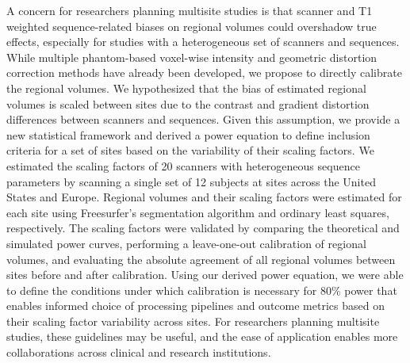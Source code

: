 
A concern for researchers planning multisite studies is that scanner and T1 weighted sequence-related biases on regional volumes could overshadow true effects, especially for studies with a heterogeneous set of scanners and sequences. While multiple phantom-based voxel-wise intensity and geometric distortion correction methods have already been developed, we propose to directly calibrate the regional volumes. We hypothesized that the bias of estimated regional volumes is scaled between sites due to the contrast and gradient distortion differences between scanners and sequences. Given this assumption, we provide a new statistical framework and derived a power equation to define inclusion criteria for a set of sites based on the variability of their scaling factors. We estimated the scaling factors of 20 scanners with heterogeneous sequence parameters by scanning a single set of 12 subjects at sites across the United States and Europe. Regional volumes and their scaling factors were estimated for each site using Freesurfer's segmentation algorithm and ordinary least squares, respectively. The scaling factors were validated by comparing the theoretical and simulated power curves, performing a leave-one-out calibration of regional volumes, and evaluating the absolute agreement of all regional volumes between sites before and after calibration. Using our derived power equation, we were able to define the conditions under which calibration is necessary for 80\% power that enables informed choice of processing pipelines and outcome metrics based on their scaling factor variability across sites. For researchers planning multisite studies, these guidelines may be useful, and the ease of application enables more collaborations across clinical and research institutions.